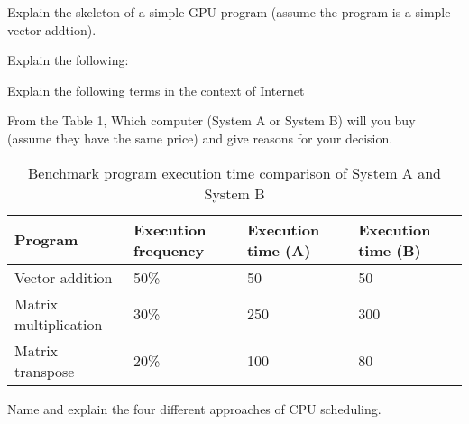 \documentclass[12pt]{exam}
\begin{document}
\newpage
\begin{questions}

\question[20] Explain the skeleton of a simple GPU program (assume the program is a simple vector addtion).  
\addpoints

\question[20] 
Explain the following:
\noaddpoints %
\addpoints


\question [20] 
Explain the following terms in the context of Internet
\noaddpoints 
{}
\addpoints


\question[20] From the Table 1, Which computer (System A or System B) will you buy (assume they have the same price) and give reasons for your decision.
\addpoints
\begin{table}[h]
\centering
\label{tbl}
\begin{tabular}{l|l|l|l}
 Program& Execution frequency &  Execution time (A) & Execution time (B)  \\\hline \hline
 Vector addition & 50\% & 50 & 50   \\
 Matrix multiplication&   30\%  & 250  & 300  \\
 Matrix transpose & 20\% & 100 & 80 \\\hline 
\end{tabular}
\caption{Benchmark program execution time comparison of System A and System B}
\end{table}

\question[20] Name and explain the four different approaches of CPU scheduling.  
\addpoints

\end{questions}
\end{document}
